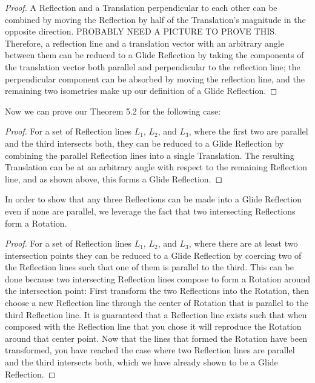 \documentclass[11pt]{article}
\theoremstyle{definition}
\begin{document}
\begin{proof}
  A Reflection and a Translation perpendicular to each other can be combined by
  moving the Reflection by half of the Translation's magnitude in the opposite
  direction.
  PROBABLY NEED A PICTURE TO PROVE THIS.
  Therefore, a reflection line and a translation vector with an arbitrary angle
  between them can be reduced to a Glide Reflection by taking the components of
  the translation vector both parallel and perpendicular to the reflection
  line; the perpendicular component can be absorbed by moving the reflection
  line, and the remaining two isometries make up our definition of a Glide
  Reflection.
\end{proof}

Now we can prove our Theorem 5.2 for the following case:

\begin{proof}
  For a set of Reflection lines $L_{1}$, $L_{2}$, and $L_{3}$, where the first
  two are parallel and the third intersects both, they can be reduced to a
  Glide Reflection by combining the parallel Reflection lines into a single
  Translation. The resulting Translation can be at an arbitrary angle with
  respect to the remaining Reflection line, and as shown above, this forms a
  Glide Reflection.
\end{proof}

In order to show that any three Reflections can be made into a Glide
Reflection even if none are parallel, we leverage the fact that two
intersecting Reflections form a Rotation.

\begin{proof}
  For a set of Reflection lines $L_{1}$, $L_{2}$, and $L_{3}$, where there are
  at least two intersection points they can be reduced to a Glide Reflection by
  coercing two of the Reflection lines such that one of them is parallel to the
  third. This can be done because two intersecting Reflection lines compose to
  form a Rotation around the intersection point: First transform the two
  Reflections into the Rotation, then choose a new Reflection line through the
  center of Rotation that is parallel to the third Reflection line. It is
  guaranteed that a Reflection line exists such that when composed with the
  Reflection line that you chose it will reproduce the Rotation around that
  center point. Now that the lines that formed the Rotation have been
  transformed, you have reached the case where two Reflection lines are
  parallel and the third intersects both, which we have already shown to be a
  Glide Reflection.
\end{proof}
\end{document}
